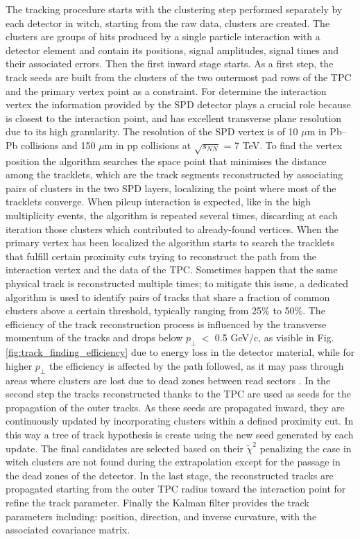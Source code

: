 \documentclass[12pt,a4paper]{book}
\begin{document}
The tracking procedure starts with the clustering step performed separately by each detector in witch, starting from the raw data, clusters are created. The clusters are groups of hits produced by a single particle interaction with a detector element and contain its positions, signal amplitudes, signal times and their associated errors. Then the first inward stage starts. As a first step, the track seeds are built from the clusters of the two outermost pad rows of the TPC and the primary vertex point as a constraint. For determine the interaction vertex the information provided by the SPD detector plays a crucial role because is closest to the interaction point, and has excellent transverse plane resolution due to its high granularity. The resolution of the SPD vertex is of 10 $\mu$m in Pb–Pb collisions and 150 $\mu$m in pp collisions at $\sqrt{s_{NN}}$ = 7 TeV. To find the vertex position the algorithm searches the space point that minimises the distance among the tracklets, which are the track segments reconstructed by associating pairs of clusters in the two SPD layers, localizing the point where most of the tracklets converge. When pileup interaction is expected, like in the high multiplicity events,  the algorithm is repeated several times, discarding at each iteration those clusters which contributed to already-found vertices. When the primary vertex has been localized the algorithm starts to search the tracklets that fulfill certain proximity cuts trying to reconstruct the path from the interaction vertex and the data of the TPC. Sometimes happen that the same physical track is reconstructed multiple times; to mitigate this issue, a dedicated algorithm is used to identify pairs of tracks that share a fraction of common clusters above a certain threshold, typically ranging from 25\% to 50\%. 
The efficiency of the track reconstruction process is influenced by the transverse momentum of the tracks and drops below $p_\perp \ <$ 0.5 GeV/c, as visible in Fig. \ref{fig:track_finding_efficiency} due to energy loss in the detector material, while for higher $p_\perp$ the efficiency is affected by the path followed, as it may pass through areas where clusters are lost due to dead zones between read sectors \cite{Padhan:2924203}.
In the second step the tracks reconstructed thanks to the TPC are used as seeds for the propagation of the outer tracks. As these seeds are propagated inward, they are continuously updated by  incorporating clusters within a defined proximity cut. In this way a tree of track hypothesis is create using the new seed generated by each update. The final candidates are selected based on their $\tilde{\chi}^2$ penalizing the case in witch clusters are not found during the extrapolation except for the passage in the dead zones of the detector. In the last stage, the reconstructed tracks are propagated starting from the outer TPC radius toward the interaction point for refine the track parameter. Finally the Kalman filter provides the track parameters including: position, direction, and inverse curvature, with the associated covariance matrix.    
\end{document}
